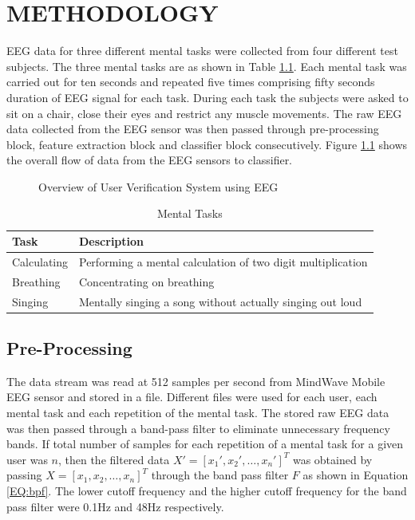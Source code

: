 \chapter{METHODOLOGY}
\label{chap-three}

	EEG data for three different mental tasks were collected from four different test subjects. The three mental tasks are as shown in Table \ref{Tasks}. Each mental task was carried out for ten seconds and repeated five times comprising fifty seconds duration of EEG signal for each task. During each task the subjects were asked to sit on a chair, close their eyes and restrict any muscle movements. The raw EEG data collected from the EEG sensor was then passed through pre-processing block, feature extraction block and classifier block consecutively. Figure \ref{fig:FlowChart} shows the overall flow of data from the EEG sensors to classifier.
		\begin{figure}[hbtp]
            \centering
    		\caption{Overview of User Verification System using EEG}
    		\label{fig:FlowChart}
    	\end{figure}
        
		\begin{table}[h]
			\centering
			\caption{Mental Tasks}
			\label{Tasks}
			\begin{tabular}{l l}
				\hline
				Task &Description\\\hline
				Calculating&Performing a mental calculation of two digit multiplication\\
				Breathing&Concentrating on breathing\\
				Singing&Mentally singing a song without actually singing out loud\\
			\end{tabular}
		\end{table}
    
    
\section{Pre-Processing}
	The data stream was read at 512 samples per second from MindWave Mobile EEG sensor and stored in a file. Different files were used for each user, each mental task and each repetition of the mental task. The stored raw EEG data was then passed through a band-pass filter to eliminate unnecessary frequency bands. If total number of samples for each repetition of a mental task for a given user was $n$, then the filtered data $X'=[x_1', x_2', \ldots, x_n']^T$ was obtained by passing $X=[x_1, x_2, \ldots, x_n]^T$ through the band pass filter $F$ as shown in Equation \ref{EQ:bpf}. The lower cutoff frequency and the higher cutoff frequency for the band pass filter were 0.1Hz and 48Hz respectively.
    
